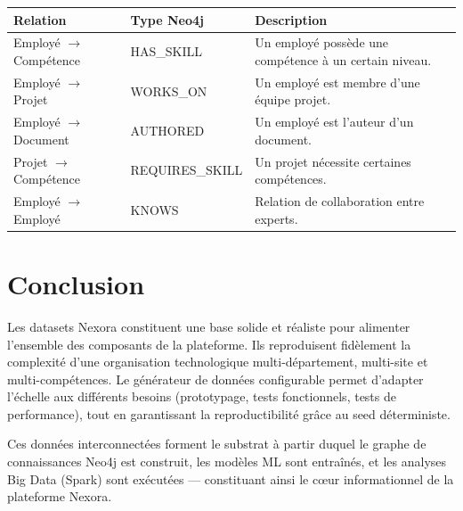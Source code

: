 \documentclass[12pt,a4paper]{article}
\begin{document}
\begin{longtable}{|p{4cm}|p{3cm}|p{6.5cm}|}
\hline
\rowcolor{bleu!15}
\textbf{Relation} & \textbf{Type Neo4j} & \textbf{Description} \\
\hline
Employé $\rightarrow$ Compétence & HAS\_SKILL & Un employé possède une compétence à un certain niveau. \\
\hline
Employé $\rightarrow$ Projet & WORKS\_ON & Un employé est membre d'une équipe projet. \\
\hline
Employé $\rightarrow$ Document & AUTHORED & Un employé est l'auteur d'un document. \\
\hline
Projet $\rightarrow$ Compétence & REQUIRES\_SKILL & Un projet nécessite certaines compétences. \\
\hline
Employé $\rightarrow$ Employé & KNOWS & Relation de collaboration entre experts. \\
\hline
\end{longtable}

\section{Conclusion}

Les datasets Nexora constituent une base solide et réaliste pour alimenter l'ensemble des composants de la plateforme. Ils reproduisent fidèlement la complexité d'une organisation technologique multi-département, multi-site et multi-compétences. Le générateur de données configurable permet d'adapter l'échelle aux différents besoins (prototypage, tests fonctionnels, tests de performance), tout en garantissant la reproductibilité grâce au seed déterministe.

Ces données interconnectées forment le substrat à partir duquel le graphe de connaissances Neo4j est construit, les modèles ML sont entraînés, et les analyses Big Data (Spark) sont exécutées — constituant ainsi le cœur informationnel de la plateforme Nexora.
\end{document}
